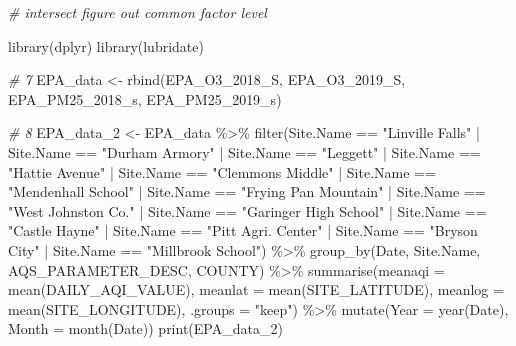 \documentclass[
]{article}
\newenvironment{Shaded}{\begin{snugshade}}{\end{snugshade}}
\newcommand{\AttributeTok}[1]{\textcolor[rgb]{0.77,0.63,0.00}{#1}}
\newcommand{\CommentTok}[1]{\textcolor[rgb]{0.56,0.35,0.01}{\textit{#1}}}
\newcommand{\FunctionTok}[1]{\textcolor[rgb]{0.00,0.00,0.00}{#1}}
\newcommand{\NormalTok}[1]{#1}
\newcommand{\OtherTok}[1]{\textcolor[rgb]{0.56,0.35,0.01}{#1}}
\newcommand{\SpecialCharTok}[1]{\textcolor[rgb]{0.00,0.00,0.00}{#1}}
\newcommand{\StringTok}[1]{\textcolor[rgb]{0.31,0.60,0.02}{#1}}
\begin{document}
\begin{Shaded}
\begin{Highlighting}[]
\CommentTok{\# intersect figure out common factor level}

\FunctionTok{library}\NormalTok{(dplyr)}
\FunctionTok{library}\NormalTok{(lubridate)}

\CommentTok{\# 7}
\NormalTok{EPA\_data }\OtherTok{\textless{}{-}} \FunctionTok{rbind}\NormalTok{(EPA\_O3\_2018\_S, EPA\_O3\_2019\_S, EPA\_PM25\_2018\_s, EPA\_PM25\_2019\_s)}

\CommentTok{\# 8}
\NormalTok{EPA\_data\_2 }\OtherTok{\textless{}{-}}\NormalTok{ EPA\_data }\SpecialCharTok{\%\textgreater{}\%}
    \FunctionTok{filter}\NormalTok{(Site.Name }\SpecialCharTok{==} \StringTok{"Linville Falls"} \SpecialCharTok{|}\NormalTok{ Site.Name }\SpecialCharTok{==} \StringTok{"Durham Armory"} \SpecialCharTok{|}\NormalTok{ Site.Name }\SpecialCharTok{==}
        \StringTok{"Leggett"} \SpecialCharTok{|}\NormalTok{ Site.Name }\SpecialCharTok{==} \StringTok{"Hattie Avenue"} \SpecialCharTok{|}\NormalTok{ Site.Name }\SpecialCharTok{==} \StringTok{"Clemmons Middle"} \SpecialCharTok{|}
\NormalTok{        Site.Name }\SpecialCharTok{==} \StringTok{"Mendenhall School"} \SpecialCharTok{|}\NormalTok{ Site.Name }\SpecialCharTok{==} \StringTok{"Frying Pan Mountain"} \SpecialCharTok{|}\NormalTok{ Site.Name }\SpecialCharTok{==}
        \StringTok{"West Johnston Co."} \SpecialCharTok{|}\NormalTok{ Site.Name }\SpecialCharTok{==} \StringTok{"Garinger High School"} \SpecialCharTok{|}\NormalTok{ Site.Name }\SpecialCharTok{==}
        \StringTok{"Castle Hayne"} \SpecialCharTok{|}\NormalTok{ Site.Name }\SpecialCharTok{==} \StringTok{"Pitt Agri. Center"} \SpecialCharTok{|}\NormalTok{ Site.Name }\SpecialCharTok{==} \StringTok{"Bryson City"} \SpecialCharTok{|}
\NormalTok{        Site.Name }\SpecialCharTok{==} \StringTok{"Millbrook School"}\NormalTok{) }\SpecialCharTok{\%\textgreater{}\%}
    \FunctionTok{group\_by}\NormalTok{(Date, Site.Name, AQS\_PARAMETER\_DESC, COUNTY) }\SpecialCharTok{\%\textgreater{}\%}
    \FunctionTok{summarise}\NormalTok{(}\AttributeTok{meanaqi =} \FunctionTok{mean}\NormalTok{(DAILY\_AQI\_VALUE), }\AttributeTok{meanlat =} \FunctionTok{mean}\NormalTok{(SITE\_LATITUDE), }\AttributeTok{meanlog =} \FunctionTok{mean}\NormalTok{(SITE\_LONGITUDE),}
        \AttributeTok{.groups =} \StringTok{"keep"}\NormalTok{) }\SpecialCharTok{\%\textgreater{}\%}
    \FunctionTok{mutate}\NormalTok{(}\AttributeTok{Year =} \FunctionTok{year}\NormalTok{(Date), }\AttributeTok{Month =} \FunctionTok{month}\NormalTok{(Date))}
\FunctionTok{print}\NormalTok{(EPA\_data\_2)}
\end{Highlighting}
\end{Shaded}
\end{document}
